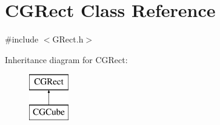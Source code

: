 \hypertarget{class_c_g_rect}{}\section{C\+G\+Rect Class Reference}
\label{class_c_g_rect}


{\ttfamily \#include $<$G\+Rect.\+h$>$}

Inheritance diagram for C\+G\+Rect\+:\begin{figure}[H]
\begin{center}
\leavevmode
\includegraphics[height=2.000000cm]{class_c_g_rect}
\end{center}
\end{figure}
